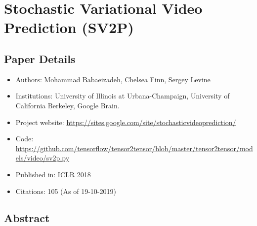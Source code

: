 \documentclass{article}
\begin{document}
    \section{Stochastic Variational Video Prediction (SV2P)}\label{sec:Stochastic_Variational_Video_Prediction_(SV2P)}
    \subsection*{Paper Details}
    \begin{itemize}
        \item Authors: Mohammad Babaeizadeh, Chelsea Finn, Sergey Levine
        \item Institutions: University of Illinois at Urbana-Champaign, University of California Berkeley, Google Brain.
        \item Project website: \url{https://sites.google.com/site/stochasticvideoprediction/}
        \item Code: \url{https://github.com/tensorflow/tensor2tensor/blob/master/tensor2tensor/models/video/sv2p.py}
        \item Published in: ICLR 2018
        \item Citations: 105 (As of 19-10-2019)
    \end{itemize}

    \subsection*{Abstract}
\end{document}
